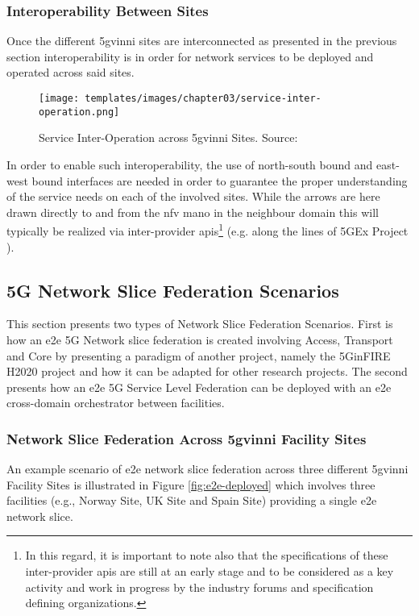     \subsubsection{Interoperability Between Sites}
    Once the different \acrshort{5gvinni} sites are interconnected as presented in the previous section interoperability is in order for network services to be deployed and operated across said sites.
    
    \begin{figure}[!ht]
        \centering
        \texttt{[image: templates/images/chapter03/service-inter-operation.png]}
        \caption{Service Inter-Operation across \acrshort{5gvinni} Sites. Source: }
        \label{service-inter-operation}
    \end{figure}  
    
    In order to enable such interoperability, the use of north-south bound and east-west bound interfaces are needed in order to guarantee the proper understanding of the service needs on each of the involved sites. While the arrows are here drawn directly to and from the \acrshort{nfv} \acrshort{mano} in the neighbour domain this will typically be realized via inter-provider \acrshort{api}s\footnote{In this regard, it is important to note also that the specifications of these inter-provider \acrshort{api}s are still at an early stage and to be considered as a key activity and work in progress by the industry forums and specification defining organizations.} (e.g. along the lines of 5GEx Project \cite{carlos_bernardos_2016_671636}).

\subsection{5G Network Slice Federation Scenarios}
This section presents two types of Network Slice Federation Scenarios. First is how an \acrshort{e2e} 5G Network slice federation is created involving Access, Transport and Core by presenting a paradigm of another project, namely the 5GinFIRE H2020 project \cite{5ginfire} and how it can be adapted for other research projects. The second presents how an \acrshort{e2e} 5G Service Level Federation can be deployed with an \acrshort{e2e} cross-domain orchestrator between facilities.
    
    \subsubsection{Network Slice Federation Across \acrshort{5gvinni} Facility Sites}
    An example scenario of \acrshort{e2e} network slice federation across three different \acrshort{5gvinni} Facility Sites is illustrated in Figure \ref{fig:e2e-deployed} which involves three facilities (e.g., Norway Site, UK Site and Spain Site) providing a single \acrshort{e2e} network slice.
    
